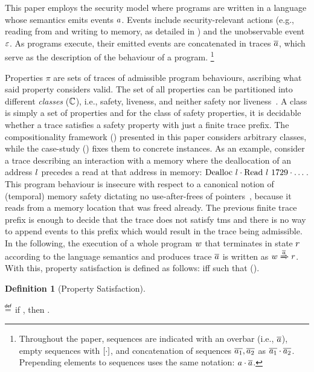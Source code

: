 \documentclass[dvipsnames,conference]{IEEEtran}
\theoremstyle{definition}
\newtheorem{definition}{Definition}[section]
\begin{document}
This paper employs the security model where programs are written in a language whose semantics emits events $\event$.
Events include security-relevant actions (e.g., reading from and writing to memory, as detailed in ) and the unobservable event $\emptyevent$.
As programs execute, their emitted events are concatenated in traces $\trace$, which serve as the description of the behaviour of a program.%
\footnote{
Throughout the paper, sequences are indicated with an overbar (i.e., $\trace$), empty sequences with $\hole{\cdot}$, and concatenation of sequences $\trace[_{1}],\trace[_{2}]$ as $\trace[_{1}]\cdot\trace[_{2}]$.
Prepending elements to sequences uses the same notation: $\event\cdot\trace$.
}

Properties $\pi$ are sets of traces of admissible program behaviours, ascribing what said property considers valid.
The set of all properties can be partitioned into different {\em classes} ($\class$), i.e., safety, liveness, and neither safety nor liveness~\cite{clarkson2008hyper}.
A class is simply a set of properties and for the class of safety properties, it is decidable whether a trace satisfies a safety property with just a finite trace prefix.
The compositionality framework () presented in this paper considers arbitrary classes, while the case-study () fixes them to concrete instances.
As an example, consider a trace describing an interaction with a memory where the deallocation of an address $\loc$ precedes a read at that address in memory: $\ev{Dealloc\ \loc}\cdot\ev{Read\ \loc\ 1729}\cdot\dots$.
This program behaviour is insecure with respect to a canonical notion of (temporal) memory safety dictating no use-after-frees of pointers~\cite{nagarakatte2010cets,azevedo2018meaningsofms}, because it reads from a memory location that was freed already.
The previous finite trace prefix is enough to decide that the trace does not satisfy \gls*{tms} and there is no way to append events to this prefix which would result in the trace being admissible.
In the following, the execution of a whole program $\wholeprogvar$ that terminates in state $\runtimetermvar$ according to the language semantics and produces trace $\trace$ is written as $\progstepto{\wholeprogvar}{\runtimetermvar}{\trace}$.
With this, property satisfaction is defined as follows:
 iff  such that  ().

\begin{definition}[Property Satisfaction]\label{def:propsat}
  $\;$\\
  \vspace{-1em}
  \begin{nscenter}
    \bul{$\sat{\progvar}{\pi}$}
    $\isdef$
    if \iul{$\forall\runtimetermvar\ \trace,\progstepto{\progvar}{\runtimetermvar}{\trace}$},
    then \oul{$\trace\in\pi$}.
  \end{nscenter}
\end{definition}
\end{document}

